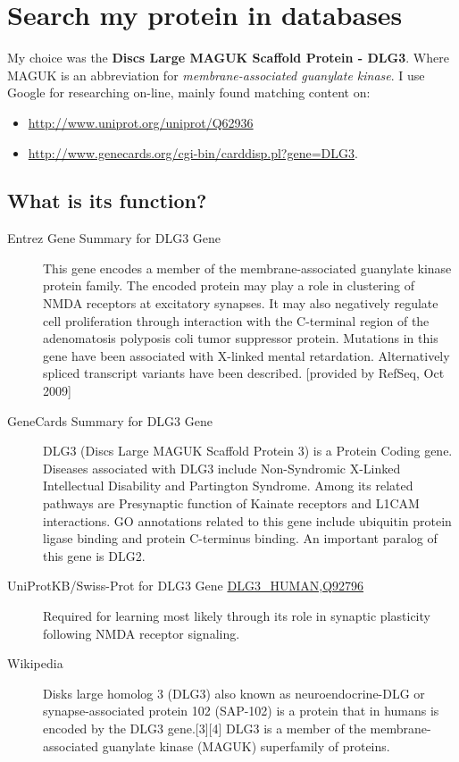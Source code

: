 \chapter{Search my protein in databases}
My choice was the \textbf{Discs Large MAGUK Scaffold Protein - DLG3}.
Where MAGUK is an abbreviation for \emph{membrane-associated guanylate kinase}.
I use Google for researching on-line, mainly found matching content on:
\begin{itemize}
\item \href{Uniprot.org}{http://www.uniprot.org/uniprot/Q62936}
\item \href{GeneCards.org}{http://www.genecards.org/cgi-bin/carddisp.pl?gene=DLG3}.
\end{itemize}

\section{What is its function?}
\begin{description}
\item[Entrez Gene Summary for DLG3 Gene]

    This gene encodes a member of the membrane-associated guanylate kinase protein family. The encoded protein may play a role in clustering of NMDA receptors at excitatory synapses. It may also negatively regulate cell proliferation through interaction with the C-terminal region of the adenomatosis polyposis coli tumor suppressor protein. Mutations in this gene have been associated with X-linked mental retardation. Alternatively spliced transcript variants have been described. [provided by RefSeq, Oct 2009]

\item[GeneCards Summary for DLG3 Gene]

DLG3 (Discs Large MAGUK Scaffold Protein 3) is a Protein Coding gene. Diseases associated with DLG3 include Non-Syndromic X-Linked Intellectual Disability and Partington Syndrome. Among its related pathways are Presynaptic function of Kainate receptors and L1CAM interactions. GO annotations related to this gene include ubiquitin protein ligase binding and protein C-terminus binding. An important paralog of this gene is DLG2.

\item[UniProtKB/Swiss-Prot for DLG3 Gene \url{DLG3_HUMAN,Q92796}]

Required for learning most likely through its role in synaptic plasticity following NMDA receptor signaling.

\item[Wikipedia]
Disks large homolog 3 (DLG3) also known as neuroendocrine-DLG or synapse-associated protein 102 (SAP-102) is a protein that in humans is encoded by the DLG3 gene.[3][4] DLG3 is a member of the membrane-associated guanylate kinase (MAGUK) superfamily of proteins.
\end{description}

